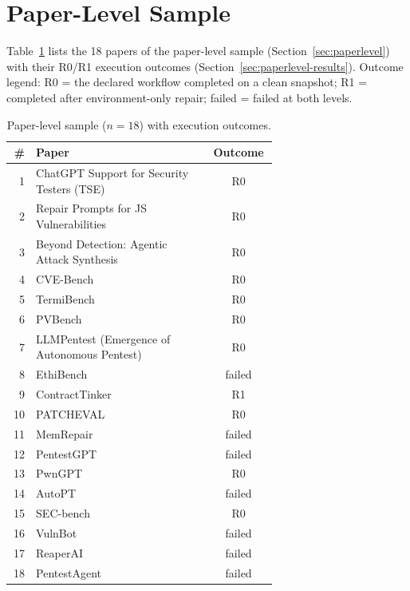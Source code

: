 \documentclass[11pt]{article}
\begin{document}
\appendix
\section{Paper-Level Sample}
\label{app:paperlist}
Table~\ref{tab:paperlist} lists the 18 papers of the paper-level sample (Section~\ref{sec:paperlevel}) with their R0/R1 execution outcomes (Section~\ref{sec:paperlevel-results}). Outcome legend: R0 = the declared workflow completed on a clean snapshot; R1 = completed after environment-only repair; failed = failed at both levels.

\begin{table}[H]
\centering
\caption{Paper-level sample ($n=18$) with execution outcomes.}
\label{tab:paperlist}
\footnotesize
\begin{tabular}{@{}rp{0.66\linewidth}c@{}}
\toprule
\# & Paper & Outcome \\
\midrule
1 & ChatGPT Support for Security Testers (TSE) & R0 \\
2 & Repair Prompts for JS Vulnerabilities & R0 \\
3 & Beyond Detection: Agentic Attack Synthesis & R0 \\
4 & CVE-Bench~\citep{cvebench} & R0 \\
5 & TermiBench~\citep{termibench} & R0 \\
6 & PVBench~\citep{pvbench} & R0 \\
7 & LLMPentest (Emergence of Autonomous Pentest)~\citep{scriptkiddies} & R0 \\
8 & EthiBench & failed \\
9 & ContractTinker~\citep{contracttinker} & R1 \\
10 & PATCHEVAL~\citep{patcheval} & R0 \\
11 & MemRepair & failed \\
12 & PentestGPT~\citep{pentestgpt} & failed \\
13 & PwnGPT & R0 \\
14 & AutoPT~\citep{autopt} & failed \\
15 & SEC-bench~\citep{secbench} & R0 \\
16 & VulnBot & failed \\
17 & ReaperAI~\citep{reaperai} & failed \\
18 & PentestAgent & failed \\
\bottomrule
\end{tabular}
\end{table}



\end{document}

